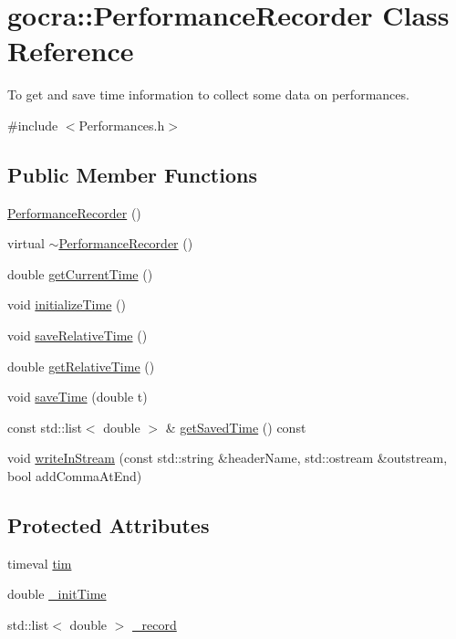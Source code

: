 \hypertarget{classgocra_1_1PerformanceRecorder}{}\section{gocra\+:\+:Performance\+Recorder Class Reference}
\label{classgocra_1_1PerformanceRecorder}


To get and save time information to collect some data on performances.  




{\ttfamily \#include $<$Performances.\+h$>$}

\subsection*{Public Member Functions}
\begin{DoxyCompactItemize}
\item 
\hyperlink{classgocra_1_1PerformanceRecorder_a65ac4c19828090b5c20b15d17cec3cd6}{Performance\+Recorder} ()
\item 
virtual \hyperlink{classgocra_1_1PerformanceRecorder_afc202dd11f2fc8fdacec3022e01946c2}{$\sim$\+Performance\+Recorder} ()
\item 
double \hyperlink{classgocra_1_1PerformanceRecorder_a96c4be3089ddcddeb69c2335108da0bf}{get\+Current\+Time} ()
\item 
void \hyperlink{classgocra_1_1PerformanceRecorder_ac0a5ac7aa54b9abc0a4c25cd291dbee9}{initialize\+Time} ()
\item 
void \hyperlink{classgocra_1_1PerformanceRecorder_a7cfcd7b0e29626e2e2a14ad4ef3bf553}{save\+Relative\+Time} ()
\item 
double \hyperlink{classgocra_1_1PerformanceRecorder_aed74024b507ec92e6ef6a3821f70f047}{get\+Relative\+Time} ()
\item 
void \hyperlink{classgocra_1_1PerformanceRecorder_aeb8e111c5e7a65ed384d39569ab1bbef}{save\+Time} (double t)
\item 
const std\+::list$<$ double $>$ \& \hyperlink{classgocra_1_1PerformanceRecorder_a8da57f275cb5364ae0eb3bbab990c35b}{get\+Saved\+Time} () const 
\item 
void \hyperlink{classgocra_1_1PerformanceRecorder_a47f171510d0f7129bf588fe5c2417043}{write\+In\+Stream} (const std\+::string \&header\+Name, std\+::ostream \&outstream, bool add\+Comma\+At\+End)
\end{DoxyCompactItemize}
\subsection*{Protected Attributes}
\begin{DoxyCompactItemize}
\item 
timeval \hyperlink{classgocra_1_1PerformanceRecorder_ab953e4252c10603dc8c25634f471db5a}{tim}
\item 
double \hyperlink{classgocra_1_1PerformanceRecorder_a45440c78a3cd0f651d5b18f0b4a268c7}{\+\_\+init\+Time}
\item 
std\+::list$<$ double $>$ \hyperlink{classgocra_1_1PerformanceRecorder_ad68f215e892c377e5dda90f883d00714}{\+\_\+record}
\end{DoxyCompactItemize}


